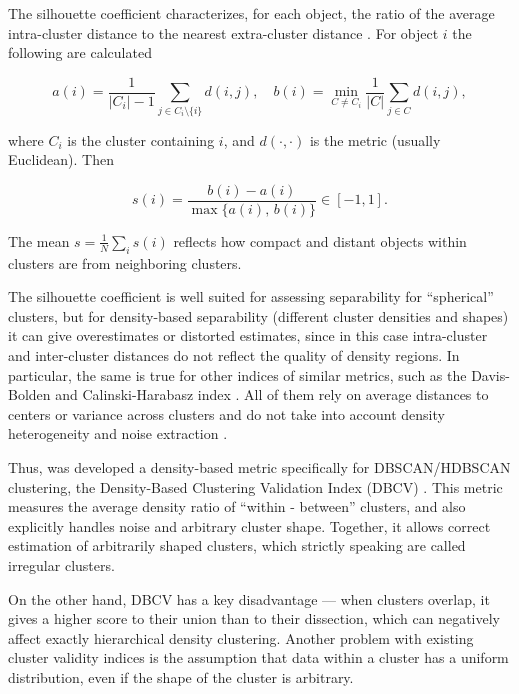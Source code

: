 The silhouette coefficient characterizes, for each object, the ratio of the average intra-cluster distance
to the nearest extra-cluster distance \parencite{silouette1987}. For object $i$ the following are calculated

\begin{equation}
    a(i)=\frac{1}{|C_i|-1}\sum_{j\in C_i\setminus\{i\}}d(i,j),\quad b(i)=\min_{C\neq C_i}\frac{1}{|C|}\sum_{j\in C}d(i,j),
\end{equation}

where $C_i$ is the cluster containing $i$, and $d(\cdot,\cdot)$ is the metric (usually Euclidean). Then

\begin{equation}
    s(i)=\frac{b(i)-a(i)}{\max\{a(i),\,b(i)\}}\in[-1,1].
\end{equation}

The mean $s=\frac1N\sum_i s(i)$ reflects how compact and distant objects within clusters are from neighboring
clusters.

The silhouette coefficient is well suited for assessing separability for “spherical” clusters, but
for density-based separability (different cluster densities and shapes) it can give overestimates or distorted
estimates, since in this case intra-cluster and inter-cluster distances do not reflect the quality of density
regions. In particular, the same is true for other indices of similar metrics, such as the Davis-Bolden and
Calinski-Harabasz index \parencite{mmj2023liu}. All of them rely on average distances to centers or variance across clusters
and do not take into account density heterogeneity and noise extraction \parencite{liu2024newindexclusteringevaluation}.

Thus, was developed a density-based metric specifically for DBSCAN/HDBSCAN clustering, the Density-Based Clustering Validation
Index (DBCV) \parencite{dbcv2014density}. This metric measures the average density ratio of “within - between” clusters,
and also explicitly handles noise and arbitrary cluster shape. Together, it allows correct estimation of arbitrarily shaped
clusters, which strictly speaking are called irregular clusters.

On the other hand, DBCV has a key disadvantage --- when clusters overlap, it gives a higher score to their union than to their
dissection, which can negatively affect exactly hierarchical density clustering. Another problem with existing cluster
validity indices is the assumption that data within a cluster has a uniform distribution, even if the shape of the cluster
is arbitrary.

